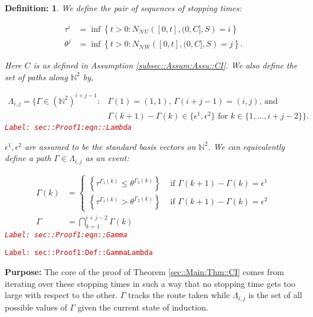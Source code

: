 \documentclass[12pt]{article}
\newcommand{\mb}{\mathbb}
\newcommand{\mc}{\mathcal}
\newcommand{\te}{\text}
\newcommand{\ep}{\epsilon}
\newcommand{\tr}{\textcolor{red}}
\newcommand{\labe}[1]{\tr{\texttt{Label: #1}}}
\newcommand{\purpose}{\textbf{Purpose: }}
\renewcommand{\U}{U}							%
\newcommand{\UU}{W}								%
\renewcommand{\S}{S}							%
\newcommand{\ev}[1]{\ep^{#1}}					%
\renewcommand{\t}{t}							%
\newcommand{\neigh}{\mc{N}}						%
\newcommand{\const}{C}							%
\newcommand{\poiss}[1]{N_{#1}}						%
\newcommand{\rt}[1]{\tau^{#1}}						%
\newcommand{\rtt}[1]{\theta^{#1}}					%
\renewcommand{\it}{k}								%
\newcommand{\itt}{i}								%
\newcommand{\ittt}{j}								%
\newcommand{\apath}{\Gamma}						%
\newcommand{\pathset}[2]{\Lambda_{#1,#2}}			%
\newtheorem{defn}[thms]{Definition: }
\begin{document}
\begin{defn}
We define the pair of sequences of stopping times:

\begin{align*}
\rt{\itt} &= \inf \left\{\t > 0: \poiss{\neigh{\U}}\left([0,\t],(0,\const{}],\S\right) = \itt\right\}\\
\rtt{\ittt} &= \inf \left\{\t > 0: \poiss{\neigh{\UU}}\left([0,\t],(0,\const{}],\S\right) = \ittt\right\}.
\end{align*}

Here \(\const{}\) is as defined in Assumption \ref{subsec::Assum:Assu::CI}. We also define the set of paths along \(\mb{N}^2\) by,

\begin{align}
\pathset{\itt}{\ittt} = \{\apath \in (\mb{N}^2)^{\itt+\ittt-1}: &\apath(1) = (1,1)\te{, } \apath(\itt+\ittt-1) = (\itt,\ittt)\te{, and } \nonumber\\
&\Gamma(\it+1) - \Gamma(\it)\in \{\ev{1},\ev{2}\}\te{ for }\it\in \{1,\dots, \itt+\ittt-2\}\}.
\label{sec::Proof1:eqn::Lambda}
\end{align}
\labe{sec::Proof1:eqn::Lambda}

\(\ev{1},\ev{2}\) are assumed to be the standard basis vectors on \(\mb{N}^2\). We can equivalently define a path \(\apath \in \pathset{\itt}{\ittt}\) as an event:

\begin{align}
\apath(\it) &= \begin{cases}
\left\{\rt{\apath_1(\it)} \leq \rtt{\apath_2(\it)}\right\} &\te{ if } \apath(\it+1) - \apath(\it) = \ev{1}\\
\left\{\rt{\apath_1(\it)} > \rtt{\apath_2(\it)}\right\} &\te{ if } \apath(\it+1) - \apath(\it) = \ev{2}
\end{cases}\\
\apath &= \bigcap_{\it=1}^{\itt+\ittt-2} \apath(\it)
\label{sec::Proof1:eqn::Gamma}
\end{align}
\labe{sec::Proof1:eqn::Gamma}
\label{sec::Proof1:Def::GammaLambda}
\end{defn}
\labe{sec::Proof1:Def::GammaLambda}

\purpose The core of the proof of Theorem \ref{sec::Main:Thm::CI} comes from iterating over these stopping times in such a way that no stopping time gets too large with respect to the other. \(\apath\) tracks the route taken while \(\pathset{\itt}{\ittt}\) is the set of all possible values of \(\apath\) given the current state of induction.
\end{document}
